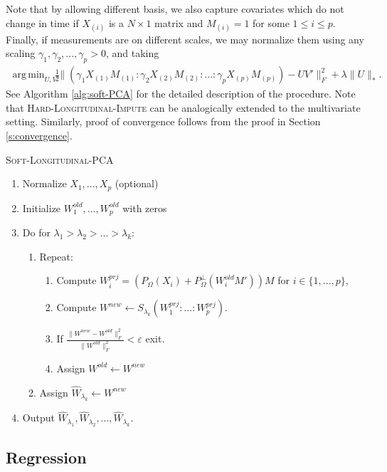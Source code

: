 \documentclass[preprint]{imsart}
\numberwithin{equation}{section}
\theoremstyle{plain}
\DeclareMathOperator*{\argmin}{arg\,min}
\begin{document}
Note that by allowing different basis, we also capture covariates which do not change in time if $X_{(i)}$ is a $N\times 1$ matrix and $M_{(i)} = 1$ for some $1 \leq i \leq p$.
Finally, if measurements are on different scales, we may normalize them using any scaling $\gamma_1, \gamma_2,..., \gamma_p > 0$, and taking
\begin{align*}%
\argmin_{U,V} \frac{1}{2} &\| (\gamma_1 X_{(1)}M_{(1)}:\gamma_2 X_{(2)}M_{(2)}:...:\gamma_p X_{(p)}M_{(p)}) - U V' \|_F^2 + \lambda\|U\|_*.
\end{align*}
See Algorithm \ref{alg:soft-PCA} for the detailed description of the procedure. Note that \textsc{Hard-Longitudinal-Impute} can be analogically extended to the multivariate setting. Similarly, proof of convergence follows from the proof in Section \ref{s:convergence}.

\begin{algorithm}
\caption{\textsc{Soft-Longitudinal-PCA}\label{alg:soft-PCA}}
\begin{enumerate}
\item Normalize $X_1,...,X_p$ (optional)
\item Initialize $W^{old}_1,...,W^{old}_p$ with zeros
\item Do for $\lambda_1 > \lambda_2 > ... > \lambda_k$:
\begin{enumerate}
\item Repeat:
\begin{enumerate}
\item Compute $W^{prj}_i = (P_\Omega(X_i) + P_\Omega^\perp(W_i^{old}M'))M$ for $i \in \{1,...,p\}$,
\item Compute $W^{new} \leftarrow S_{\lambda_k}( W^{prj}_1 : ... : W^{prj}_p )$.
\item If $\frac{\|W^{new} - W^{old}\|_F^2}{\|W^{old}\|_F^2} < \varepsilon$ exit.
\item Assign $W^{old} \leftarrow W^{new}$
\end{enumerate}
\item Assign $\hat{W}_{\lambda_k} \leftarrow W^{new}$
\end{enumerate}
\item Output $\hat{W}_{\lambda_1}, \hat{W}_{\lambda_2}, ... , \hat{W}_{\lambda_k}$.
\end{enumerate}
\end{algorithm}

\subsection{Regression}\label{ss:regression}
\end{document}
